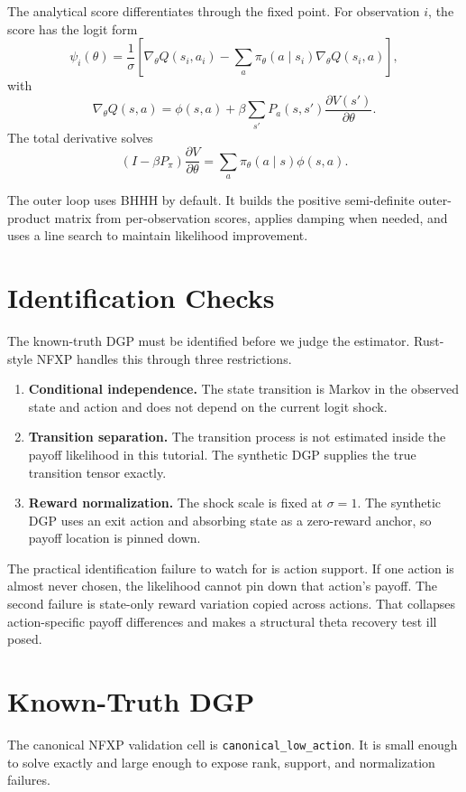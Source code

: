 \documentclass[10pt]{article}
\begin{document}
The analytical score differentiates through the fixed point. For observation
$i$, the score has the logit form
\[
\psi_i(\theta)
=
\frac{1}{\sigma}
\left[
\nabla_\theta Q(s_i,a_i)
-
\sum_a \pi_\theta(a\mid s_i)\nabla_\theta Q(s_i,a)
\right],
\]
with
\[
\nabla_\theta Q(s,a)
=
\phi(s,a)
+
\beta \sum_{s'} P_a(s,s')\frac{\partial V(s')}{\partial \theta}.
\]
The total derivative solves
\[
(I-\beta P_\pi)\frac{\partial V}{\partial \theta}
=
\sum_a \pi_\theta(a\mid s)\phi(s,a).
\]

The outer loop uses BHHH by default. It builds the positive semi-definite
outer-product matrix from per-observation scores, applies damping when needed,
and uses a line search to maintain likelihood improvement.

\section{Identification Checks}

The known-truth DGP must be identified before we judge the estimator.
Rust-style NFXP handles this through three restrictions.

\begin{enumerate}
\item \textbf{Conditional independence.} The state transition is Markov in the
observed state and action and does not depend on the current logit shock.
\item \textbf{Transition separation.} The transition process is not estimated
inside the payoff likelihood in this tutorial. The synthetic DGP supplies the
true transition tensor exactly.
\item \textbf{Reward normalization.} The shock scale is fixed at $\sigma=1$.
The synthetic DGP uses an exit action and absorbing state as a zero-reward
anchor, so payoff location is pinned down.
\end{enumerate}

The practical identification failure to watch for is action support. If one
action is almost never chosen, the likelihood cannot pin down that action's
payoff. The second failure is state-only reward variation copied across
actions. That collapses action-specific payoff differences and makes a
structural theta recovery test ill posed.

\section{Known-Truth DGP}

The canonical NFXP validation cell is \texttt{canonical\_low\_action}. It is
small enough to solve exactly and large enough to expose rank, support, and
normalization failures.
\end{document}
